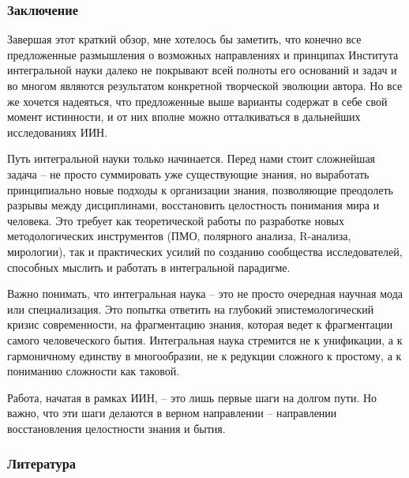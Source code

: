     \subsubsection*{Заключение}
    Завершая этот краткий обзор, мне хотелось бы заметить, что конечно все предложенные размышления о возможных направлениях и принципах Института интегральной науки далеко не покрывают всей полноты его оснований и задач и во многом являются результатом конкретной творческой эволюции автора. Но все же хочется надеяться, что предложенные выше варианты содержат в себе свой момент истинности, и от них вполне можно отталкиваться в дальнейших исследованиях ИИН.

    Путь интегральной науки только начинается. Перед нами стоит сложнейшая задача – не просто суммировать уже существующие знания, но выработать принципиально новые подходы к организации знания, позволяющие преодолеть разрывы между дисциплинами, восстановить целостность понимания мира и человека. Это требует как теоретической работы по разработке новых методологических инструментов (ПМО, полярного анализа, R-анализа, мирологии), так и практических усилий по созданию сообщества исследователей, способных мыслить и работать в интегральной парадигме.

    Важно понимать, что интегральная наука – это не просто очередная научная мода или специализация. Это попытка ответить на глубокий эпистемологический кризис современности, на фрагментацию знания, которая ведет к фрагментации самого человеческого бытия. Интегральная наука стремится не к унификации, а к гармоничному единству в многообразии, не к редукции сложного к простому, а к пониманию сложности как таковой.

    Работа, начатая в рамках ИИН, – это лишь первые шаги на долгом пути. Но важно, что эти шаги делаются в верном направлении – направлении восстановления целостности знания и бытия.
    
    \subsubsection*{Литература}
    \printbibliography[heading=none]
\fi
